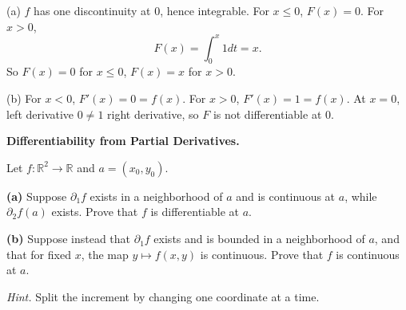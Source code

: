 \begin{solution}
(a) $f$ has one discontinuity at $0$, hence integrable. For $x\leq 0$, $F(x)=0$. For $x>0$,
	\[
	F(x)=\int_0^x 1dt=x.
	\]
	So $F(x)=0$ for $x\leq 0$, $F(x)=x$ for $x>0$.

	(b) For $x<0$, $F'(x)=0=f(x)$. For $x>0$, $F'(x)=1=f(x)$. At $x=0$, left derivative $0\neq 1$ right derivative, so $F$ is not differentiable at $0$.
\end{solution}

\begin{problem}[CP-II-0032]
\label{prob:cp-ii-0032}
\textbf{Differentiability from Partial Derivatives.}

\hspace*{1.5em}Let \(f:\mathbb R^2\to\mathbb R\) and \(a=(x_0,y_0)\).

\par\smallskip\noindent\textbf{(a)}\quad
Suppose \(\partial_1f\) exists in a neighborhood of \(a\) and is continuous
at \(a\), while \(\partial_2f(a)\) exists. Prove that \(f\) is differentiable
at \(a\).

\par\smallskip\noindent\textbf{(b)}\quad
Suppose instead that \(\partial_1f\) exists and is bounded in a neighborhood
of \(a\), and that for fixed \(x\), the map \(y\mapsto f(x,y)\) is continuous.
Prove that \(f\) is continuous at \(a\).

\emph{Hint.} Split the increment by changing one coordinate at a time.
\end{problem}

